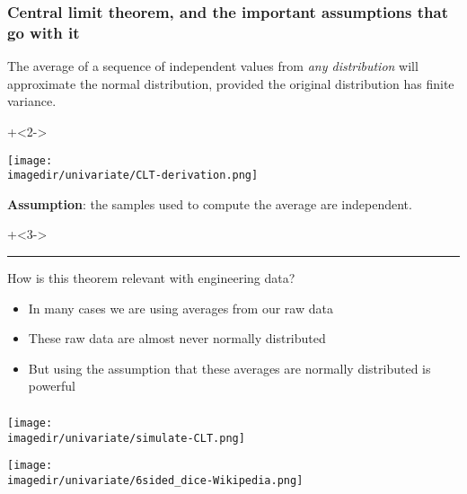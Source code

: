 \begin{frame}\frametitle{Central limit theorem, \textbf{and} the important assumptions that go with it}
	\begin{exampleblock}{\color{purple}{Central limit theorem}}
		
		
			The average of a sequence of independent values from \emph{any distribution} will approximate the normal distribution, provided the original distribution has finite variance.
		
	\end{exampleblock}
	\onslide+<2->{
		\texttt{[image: \\imagedir/univariate/CLT-derivation.png]}
		
		\textbf{Assumption}: the samples used to compute the average are independent.
	}
	
	\vspace{4pt}
	\onslide+<3->{
		\hrule
		\vspace{4pt}
		How is this theorem relevant with engineering data?
		\begin{itemize}
			\item	In many cases we are using averages from our raw data
			\item	These raw data are almost never normally distributed
			\item	But using the assumption that these averages are normally distributed is powerful
		\end{itemize}
	}
\end{frame}

\begin{frame}\frametitle{}
	\vspace{-5.8cm}
	\texttt{[image: \\imagedir/univariate/simulate-CLT.png]}
	
	\vspace{-9cm}
	\hfill \texttt{[image: \\imagedir/univariate/6sided\_dice-Wikipedia.png]}
\end{frame}

